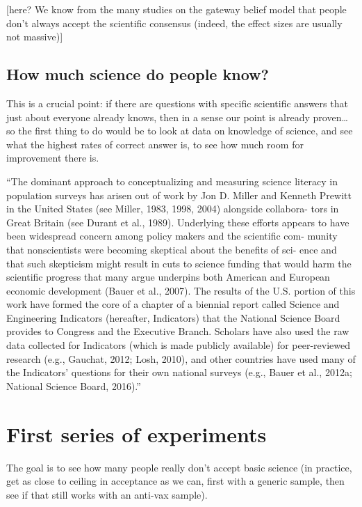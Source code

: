\documentclass[
  doc,floatsintext]{apa6}
\begin{document}
{[}here? We know from the many studies on the gateway belief model that people don't always accept the scientific consensus (indeed, the effect sizes are usually not massive){]}

\hypertarget{how-much-science-do-people-know}{%
\subsection{How much science do people know?}\label{how-much-science-do-people-know}}

This is a crucial point: if there are questions with specific scientific answers that just about everyone already knows, then in a sense our point is already proven\ldots{} so the first thing to do would be to look at data on knowledge of science, and see what the highest rates of correct answer is, to see how much room for improvement there is.

``The dominant approach to conceptualizing and measuring science literacy in population surveys has arisen out of work by Jon D. Miller and Kenneth Prewitt in the United States (see Miller, 1983, 1998, 2004) alongside collabora- tors in Great Britain (see Durant et al., 1989). Underlying these efforts appears to have been widespread concern among policy makers and the scientific com- munity that nonscientists were becoming skeptical about the benefits of sci- ence and that such skepticism might result in cuts to science funding that would harm the scientific progress that many argue underpins both American and European economic development (Bauer et al., 2007). The results of the U.S. portion of this work have formed the core of a chapter of a biennial report called Science and Engineering Indicators (hereafter, Indicators) that the National Science Board provides to Congress and the Executive Branch. Scholars have also used the raw data collected for Indicators (which is made publicly available) for peer-reviewed research (e.g., Gauchat, 2012; Losh, 2010), and other countries have used many of the Indicators' questions for their own national surveys (e.g., Bauer et al., 2012a; National Science Board, 2016).''

\hypertarget{first-series-of-experiments}{%
\section{First series of experiments}\label{first-series-of-experiments}}

The goal is to see how many people really don't accept basic science (in practice, get as close to ceiling in acceptance as we can, first with a generic sample, then see if that still works with an anti-vax sample).
\end{document}
